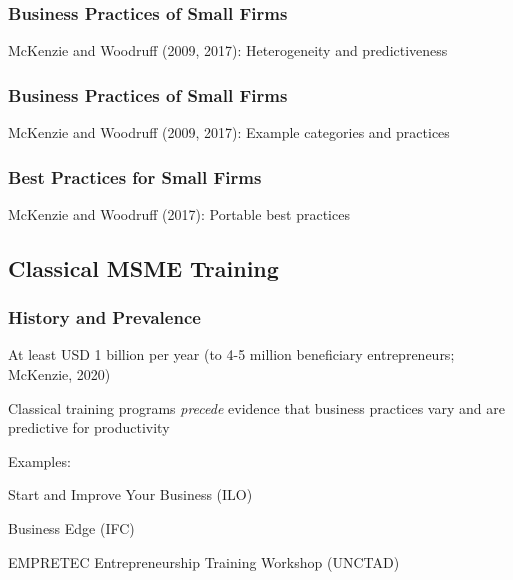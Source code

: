 \documentclass[hideothersubsections, usenames,dvipsnames,10pt]{beamer}
\newenvironment{itemize_3pt}{\itemize\addtolength{\itemsep}{3pt}}{\enditemize}
\begin{document}

\begin{frame}
\frametitle{Business Practices of Small Firms}
	\begin{itemize_3pt}
	\item McKenzie and Woodruff (2009, 2017): Heterogeneity and predictiveness
	\vspace{0.1in}
	\end{itemize_3pt}
\end{frame}

\begin{frame}
\frametitle{Business Practices of Small Firms}
	\begin{itemize_3pt}
	\item McKenzie and Woodruff (2009, 2017): Example categories and practices
	\vspace{0.1in}
	\end{itemize_3pt}
\end{frame}


\begin{frame}
\frametitle{Best Practices for Small Firms}
	\begin{itemize_3pt}
	\item McKenzie and Woodruff (2017): Portable best practices
	\vspace{0.1in}
	\end{itemize_3pt}
\end{frame}


\subsection{Classical MSME Training}


\begin{frame}
\frametitle{History and Prevalence}
	\begin{itemize_3pt}
		\item At least \textcolor{bdf}{USD 1 billion per year} (to 4-5 million beneficiary entrepreneurs; McKenzie, 2020)
		\item Classical training programs \emph{precede} evidence that business practices vary and are predictive for productivity
		\vspace{0.1in}
		\item Examples:
		\begin{itemize_3pt}
			\item Start and Improve Your Business (ILO)
			\item Business Edge (IFC)
			\item EMPRETEC Entrepreneurship Training Workshop (UNCTAD)
		\end{itemize_3pt} 
	\end{itemize_3pt}
\end{frame}
\end{document}
